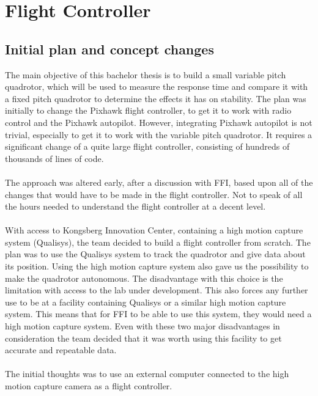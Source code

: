 \section{Flight Controller}

\subsection{Initial plan and concept changes}
The main objective of this bachelor thesis is to build a small variable pitch quadrotor, which will be used to measure the response time and compare it with a fixed pitch quadrotor to determine the effects it has on stability. The plan was initially to change the Pixhawk flight controller, to get it to work with radio control and the Pixhawk autopilot. However, integrating Pixhawk autopilot is not trivial, especially to get it to work with the variable pitch quadrotor. It requires a significant change of a quite large flight controller, consisting of hundreds of thousands of lines of code. 
\\\\
The approach was altered early, after a discussion with FFI, based upon all of the changes that would have to be made in the flight controller. Not to speak of all the hours needed to understand the flight controller at a decent level. 
\\\\
With access to Kongsberg Innovation Center, containing a high motion capture system (Qualisys), the team decided to build a flight controller from scratch. The plan was to use the Qualisys system to track the quadrotor and give data about its position. Using the high motion capture system also gave us the possibility to make the quadrotor autonomous. The disadvantage with this choice is the limitation with access to the lab under development. This also forces any further use to be at a facility containing Qualisys or a similar high motion capture system. This means that for FFI to be able to use this system, they would need a high motion capture system. Even with these two major disadvantages in consideration the team decided that it was worth using this facility to get accurate and repeatable data.  
\\\\
The initial thoughts was to use an external computer connected to the high motion capture camera as a flight controller.\\

